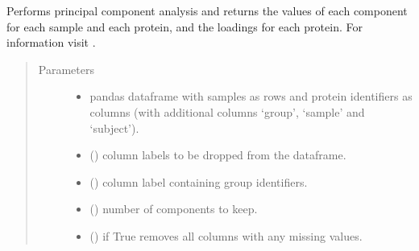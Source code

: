 \documentclass[letterpaper,10pt,english]{sphinxmanual}
\begin{document}
\begin{fulllineitems}
\label{\detokenize{_autosummary/analytics_core.analytics:analytics_core.analytics.analytics.run_pca}}
Performs principal component analysis and returns the values of each component for each sample and each protein, and the loadings for each protein.     For information visit .
\begin{quote}\begin{description}
\item[{Parameters}] \leavevmode\begin{itemize}
\item {} 
 \textendash{} pandas dataframe with samples as rows and protein identifiers as columns (with additional columns ‘group’, ‘sample’ and ‘subject’).

\item {} 
 () \textendash{} column labels to be dropped from the dataframe.

\item {} 
 () \textendash{} column label containing group identifiers.

\item {} 
 () \textendash{} number of components to keep.

\item {} 
 () \textendash{} if True removes all columns with any missing values.

\end{itemize}


\end{description}
\end{quote}
\end{fulllineitems}
\end{document}
